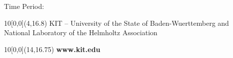 \begin{titlepage}
\vspace{2cm}

\begin{center}
\large{Time Period:~~\@date}
\end{center}

\begin{textblock}{10}[0,0](4,16.8)
\tiny{KIT -- University of the State of Baden-Wuerttemberg and National Laboratory of the Helmholtz Association}
\end{textblock}

\begin{textblock}{10}[0,0](14,16.75)
\large{\textbf{www.kit.edu}}
\end{textblock}

\end{titlepage}
\makeatother
